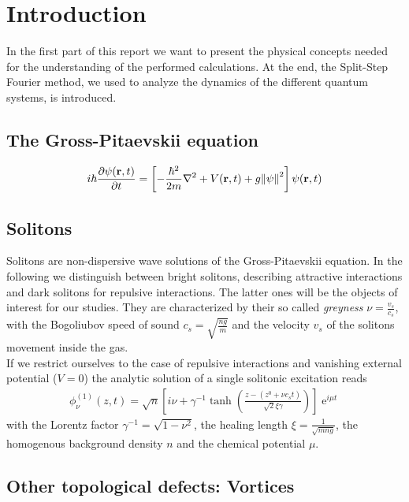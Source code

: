 \section{Introduction}
In the first part of this report we want to present the physical concepts needed for the understanding of the performed calculations. At the end, the Split-Step Fourier method, we used to analyze the dynamics of the different quantum systems, is introduced.

\subsection{The Gross-Pitaevskii equation}

\begin{align}
	i\hbar \frac{\partial\psi(\mathbf{r}, t)}{\partial t} = \left[-\frac{\hbar^2}{2m}\nabla^2 + V(\mathbf{r}, t) + g\norm{\psi}^2\right]\psi(\mathbf{r}, t)
\end{align}


\subsection{Solitons}
Solitons are non-dispersive wave solutions of the Gross-Pitaevskii equation. In the following we distinguish between bright solitons, describing attractive interactions and dark solitons for repulsive interactions. The latter ones will be the objects of interest for our studies. They are characterized by their so called \textit{greyness} $\nu = \frac{v_s}{c_s}$, with the Bogoliubov speed of sound $c_s = \sqrt{\frac{ng}{m}}$ and the velocity $v_s$ of the solitons movement inside the gas. \\
If we restrict ourselves to the case of repulsive interactions and vanishing external potential ($V=0$) the analytic solution of a single solitonic excitation reads 
\begin{align}
	\phi_{\nu}^{(1)}(z,t) = \sqrt{n}\left[ i\nu + \gamma^{-1}\tanh\left(\frac{z - (z^0 + \nu c_s t)}{\sqrt{2}\xi\gamma}\right) \right]\operatorname{e}^{i\mu t}
\end{align}
with the Lorentz factor $\gamma^{-1} = \sqrt{1 - \nu^2}$, the healing length $\xi = \frac{1}{\sqrt{mng}}$, the homogenous background density $n$ and the chemical potential $\mu$.


\subsection{Other topological defects: Vortices}

